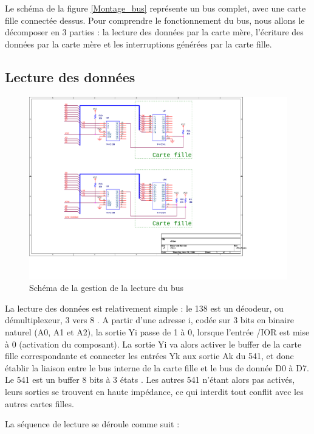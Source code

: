 \documentclass[a4paper]{article}
\begin{document}
Le schéma de la figure \ref{Montage_bus} représente un bus complet, avec une carte fille connectée dessus. Pour comprendre le fonctionnement du bus, nous allons le décomposer en 3 parties : la lecture des données par la carte mère, l'écriture des données par la carte mère et les interruptions générées par la carte fille.

\subsection{Lecture des données}

\begin{figure}[H]
	\centering
	\includegraphics[scale=1.00]{Images/Montage_bus_lecture}
	\caption{Schéma de la gestion de la lecture du bus
		\label{Montage_bus_lecture}}
\end{figure}

La lecture des données est relativement simple : le 138 est un décodeur, ou démultiplexeur, 3 vers 8 \cite{74HC138}. A partir d'une adresse i, codée sur 3 bits en binaire naturel (A0, A1 et A2), la sortie Yi passe de 1 à 0, lorsque l'entrée /IOR est mise à 0 (activation du composant). La sortie Yi va alors activer le buffer de la carte fille correspondante et connecter les entrées Yk aux sortie Ak du 541, et donc établir la liaison entre le bus interne de la carte fille et le bus de donnée D0 à D7. Le 541 est un buffer 8 bits à 3 états \cite{74HC541}. Les autres 541 n'étant alors pas activés, leurs sorties se trouvent en haute impédance, ce qui interdit tout conflit avec les autres cartes filles.

La séquence de lecture se déroule comme suit :
\end{document}

